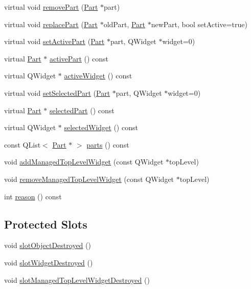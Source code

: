 \begin{DoxyCompactItemize}
\item 
virtual void \hyperlink{classKParts_1_1PartManager_a0b24449299b70c53b623f22d6a0ea0db}{remove\-Part} (\hyperlink{classKParts_1_1Part}{\-Part} $\ast$part)
\item 
virtual void \hyperlink{classKParts_1_1PartManager_af8bffaa758fc5c4009d3d1d9e37cad82}{replace\-Part} (\hyperlink{classKParts_1_1Part}{\-Part} $\ast$old\-Part, \hyperlink{classKParts_1_1Part}{\-Part} $\ast$new\-Part, bool set\-Active=true)
\item 
virtual void \hyperlink{classKParts_1_1PartManager_af7b5c8d0002fdd97805e2cd6e5edf953}{set\-Active\-Part} (\hyperlink{classKParts_1_1Part}{\-Part} $\ast$part, \-Q\-Widget $\ast$widget=0)
\item 
virtual \hyperlink{classKParts_1_1Part}{\-Part} $\ast$ \hyperlink{classKParts_1_1PartManager_a5d2bd122e406ce153cc28135e2da78de}{active\-Part} () const 
\item 
virtual \-Q\-Widget $\ast$ \hyperlink{classKParts_1_1PartManager_aa2b5518384d745561b968764ca7ca2b1}{active\-Widget} () const 
\item 
virtual void \hyperlink{classKParts_1_1PartManager_a1df9580cc201575d32c3203296678dbb}{set\-Selected\-Part} (\hyperlink{classKParts_1_1Part}{\-Part} $\ast$part, \-Q\-Widget $\ast$widget=0)
\item 
virtual \hyperlink{classKParts_1_1Part}{\-Part} $\ast$ \hyperlink{classKParts_1_1PartManager_a706102e108c2683b9e38782545e0a817}{selected\-Part} () const 
\item 
virtual \-Q\-Widget $\ast$ \hyperlink{classKParts_1_1PartManager_a92a6bf8063ca8b38728199b49983637c}{selected\-Widget} () const 
\item 
const \-Q\-List$<$ \hyperlink{classKParts_1_1Part}{\-Part} $\ast$ $>$ \hyperlink{classKParts_1_1PartManager_a9d5edb8bc36564f884a63f54a50ec787}{parts} () const 
\item 
void \hyperlink{classKParts_1_1PartManager_abe98bb196d2d7d6e154f554dd32e5ae0}{add\-Managed\-Top\-Level\-Widget} (const \-Q\-Widget $\ast$top\-Level)
\item 
void \hyperlink{classKParts_1_1PartManager_a4e4efe62ab0feb8ecd7c2463e179a77d}{remove\-Managed\-Top\-Level\-Widget} (const \-Q\-Widget $\ast$top\-Level)
\item 
int \hyperlink{classKParts_1_1PartManager_a35ac9816c27e769deeed841ada32c36d}{reason} () const 
\end{DoxyCompactItemize}
\subsection*{\-Protected \-Slots}
\begin{DoxyCompactItemize}
\item 
void \hyperlink{classKParts_1_1PartManager_a302a72cbb49af3e0a812ce5e9225c365}{slot\-Object\-Destroyed} ()
\item 
void \hyperlink{classKParts_1_1PartManager_ae4126097ecd82d223c316a2b2bb3ef4f}{slot\-Widget\-Destroyed} ()
\item 
void \hyperlink{classKParts_1_1PartManager_a74ca60268029a118ee48bb8d84b729e7}{slot\-Managed\-Top\-Level\-Widget\-Destroyed} ()
\end{DoxyCompactItemize}
